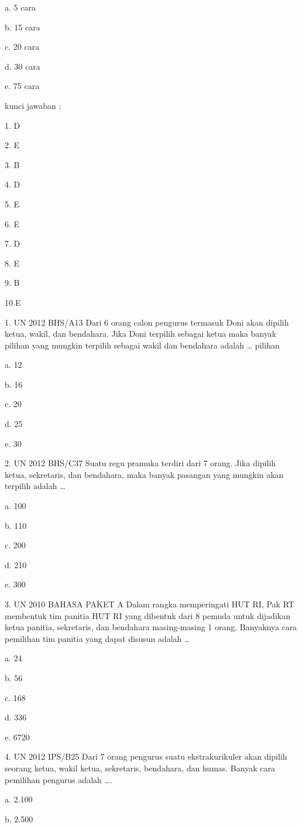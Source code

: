 \documentclass[11pt,fleqn]{book} %
\begin{document}
a.	5 cara

b.	15 cara

c.	20 cara

d.	30 cara

e.	75 cara



kunci jawaban :

1. D

2. E

3. B 

4. D

5. E

6. E

7. D

8. E

9. B

10.E


1.	UN 2012 BHS/A13
Dari 6 orang calon pengurus termasuk Doni akan dipilih ketua, wakil, dan bendahara. Jika Doni terpilih sebagai ketua maka banyak pilihan yang mungkin terpilih sebagai wakil dan bendahara adalah … pilihan

a.	12

b.	16

c.	20

d.	25

e.	30

2.	UN 2012 BHS/C37
Suatu regu pramuka terdiri dari 7 orang. Jika dipilih ketua, sekretaris, dan bendahara, maka banyak pasangan yang mungkin akan terpilih adalah …

a.	100

b.	110

c.	200

d.	210

e.	300

3.	UN 2010 BAHASA PAKET A 
Dalam rangka memperingati HUT RI, Pak RT membentuk tim panitia HUT RI yang dibentuk dari 8 pemuda untuk dijadikan ketua panitia, sekretaris, dan bendahara masing-masing 1 orang. Banyaknya cara pemilihan tim panitia yang dapat disusun adalah …

a.	24

b.	56

c.	168

d.	336

e.	6720


4.	UN 2012 IPS/B25
Dari 7 orang pengurus suatu ekstrakurikuler akan dipilih seorang ketua, wakil ketua, sekretaris, bendahara, dan humas. Banyak cara pemilihan pengurus adalah ….

a.	2.100

b.	2.500
\end{document}
